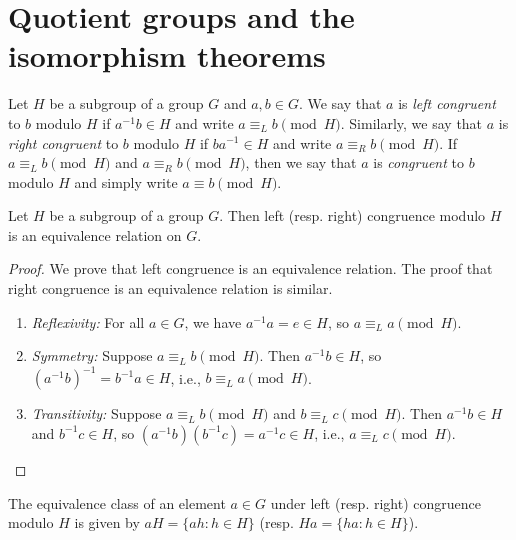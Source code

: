 \section{Quotient groups and the isomorphism theorems}

\begin{definition}
    Let \(H\) be a subgroup of a group \(G\) and \(a, b \in G\). We say that
    \(a\) is \emph{left congruent} to \(b\) modulo \(H\) if \(a^{-1}b \in H\)
    and write \(a \equiv_L b \pmod{H}\). Similarly, we say that \(a\) is
    \emph{right congruent} to \(b\) modulo \(H\) if \(ba^{-1} \in H\) and write
    \(a \equiv_R b \pmod{H}\). If \(a \equiv_L b \pmod{H}\) and \(a \equiv_R b
    \pmod{H}\), then we say that \(a\) is \emph{congruent} to \(b\) modulo \(H\)
    and simply write \(a \equiv b \pmod{H}\).
\end{definition}

\begin{theorem}
    Let \(H\) be a subgroup of a group \(G\). Then left (resp. right) congruence
    modulo \(H\) is an equivalence relation on \(G\).
\end{theorem}

\begin{proof}
    We prove that left congruence is an equivalence relation. The proof that
    right congruence is an equivalence relation is similar.

    \begin{enumerate}
        \item \emph{Reflexivity:} For all \(a \in G\), we have \(a^{-1}a = e \in
        H\), so \(a \equiv_L a \pmod{H}\).
        \item \emph{Symmetry:} Suppose \(a \equiv_L b \pmod{H}\). Then \(a^{-1}b
        \in H\), so \((a^{-1}b)^{-1} = b^{-1}a \in H\), i.e., \(b \equiv_L a
        \pmod{H}\).
        \item \emph{Transitivity:} Suppose \(a \equiv_L b \pmod{H}\) and \(b
        \equiv_L c \pmod{H}\). Then \(a^{-1}b \in H\) and \(b^{-1}c \in H\), so
        \((a^{-1}b)(b^{-1}c) = a^{-1}c \in H\), i.e., \(a \equiv_L c \pmod{H}\).
    \end{enumerate}
\end{proof}

\begin{theorem}
    \label{thm:cosets-equiv-classes}
    The equivalence class of an element \(a \in G\) under left (resp. right)
    congruence modulo \(H\) is given by \(aH = \{ah : h \in H\}\) (resp. \(Ha =
    \{ha : h \in H\}\)).
\end{theorem}

